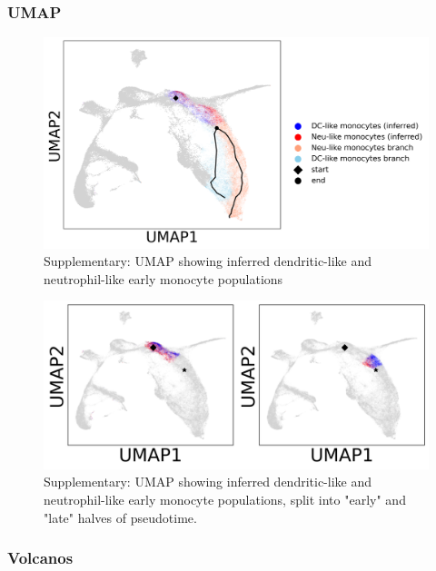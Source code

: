 \documentclass[a4paper]{article}
\begin{document}
\subsubsection{UMAP}
\begin{figure}[!htb]
  \centering
  \includegraphics[width=\textwidth]{../figures/hematopoiesis/markers_early_groups_umap.png}
  \caption{Supplementary: UMAP showing inferred dendritic-like and neutrophil-like early monocyte populations }
\end{figure}

\begin{figure}[!htb]
  \centering
  \includegraphics[width=\textwidth]{../figures/hematopoiesis/markers_early_groups_umap_split.png}
  \caption{Supplementary: UMAP showing inferred dendritic-like and neutrophil-like early monocyte populations, split into "early" and "late" halves of pseudotime. }
\end{figure}

\FloatBarrier
\subsubsection{Volcanos}
\end{document}
